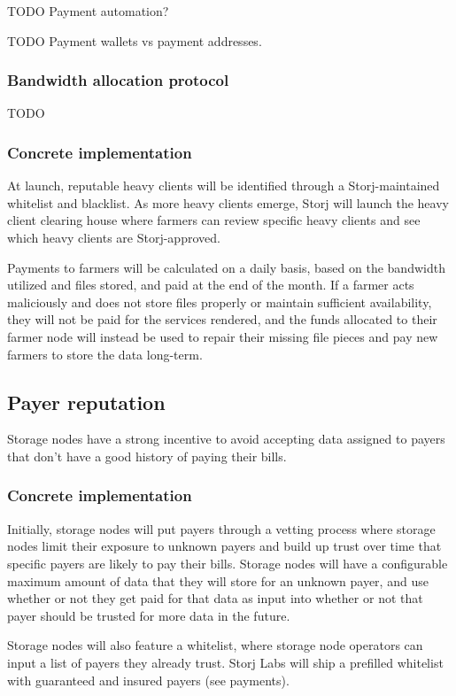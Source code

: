 \documentclass[a4paper,10pt]{article} \usepackage[utf8]{inputenc}
\newcommand{\todo}[1]{{\color{red} TODO #1 }}
\begin{document}
\todo{Payment automation?}

\todo{Payment wallets vs payment addresses. }

\subsubsection{Bandwidth allocation protocol}

\todo{}

\subsubsection{Concrete implementation}
At launch, reputable heavy clients will be identified through a
Storj-maintained whitelist and blacklist. As more heavy clients emerge, Storj
will launch the heavy client clearing house where farmers can review specific
heavy clients and see which heavy clients are Storj-approved.

Payments to farmers will be calculated on a daily basis, based on the bandwidth
utilized and files stored, and paid at the end of the month. If a farmer acts
maliciously and does not store files properly or maintain sufficient
availability, they will not be paid for the services rendered, and the funds
allocated to their farmer node will instead be used to repair their missing
file pieces and pay new farmers to store the data long-term.

\subsection{Payer reputation}

Storage nodes have a strong incentive to avoid accepting data assigned to payers
that don't have a good history of paying their bills.

\subsubsection{Concrete implementation}

Initially, storage nodes will put payers through a vetting process
where storage nodes limit their exposure to unknown payers and build up trust
over time that specific payers are likely to pay their bills. Storage nodes
will have a configurable maximum amount of data that they will store for an
unknown payer, and use whether or not they get paid for that data as input into
whether or not that payer should be trusted for more data in the future.

Storage nodes will also feature a whitelist, where storage node operators can
input a list of payers they already trust. Storj Labs will ship a prefilled
whitelist with guaranteed and insured payers (see payments).
\end{document}
